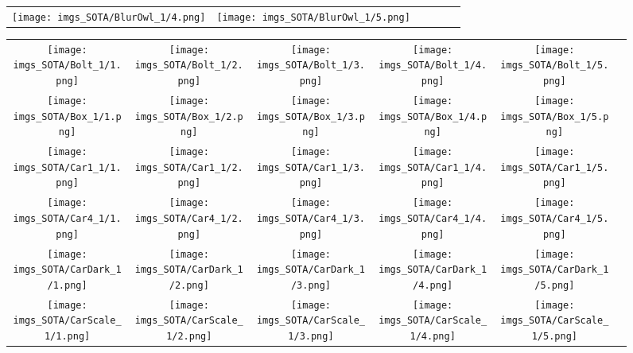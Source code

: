 \begin{figure}[H]
\begin{tabular}{@{}c@{}c@{}c@{}c@{}c@{}c@{}}
\texttt{[image: imgs\_SOTA/BlurOwl\_1/4.png]}&
\texttt{[image: imgs\_SOTA/BlurOwl\_1/5.png]}&
\\
\end{tabular}\end{figure}\begin{figure}[H]
\setlength{\tabcolsep}{6pt}
\renewcommand{\arraystretch}{0}
\begin{tabular}{@{}c@{}c@{}c@{}c@{}c@{}c@{}}\texttt{[image: imgs\_SOTA/Bolt\_1/1.png]}&
\texttt{[image: imgs\_SOTA/Bolt\_1/2.png]}&
\texttt{[image: imgs\_SOTA/Bolt\_1/3.png]}&
\texttt{[image: imgs\_SOTA/Bolt\_1/4.png]}&
\texttt{[image: imgs\_SOTA/Bolt\_1/5.png]}&
\\
\texttt{[image: imgs\_SOTA/Box\_1/1.png]}&
\texttt{[image: imgs\_SOTA/Box\_1/2.png]}&
\texttt{[image: imgs\_SOTA/Box\_1/3.png]}&
\texttt{[image: imgs\_SOTA/Box\_1/4.png]}&
\texttt{[image: imgs\_SOTA/Box\_1/5.png]}&
\\
\texttt{[image: imgs\_SOTA/Car1\_1/1.png]}&
\texttt{[image: imgs\_SOTA/Car1\_1/2.png]}&
\texttt{[image: imgs\_SOTA/Car1\_1/3.png]}&
\texttt{[image: imgs\_SOTA/Car1\_1/4.png]}&
\texttt{[image: imgs\_SOTA/Car1\_1/5.png]}&
\\
\texttt{[image: imgs\_SOTA/Car4\_1/1.png]}&
\texttt{[image: imgs\_SOTA/Car4\_1/2.png]}&
\texttt{[image: imgs\_SOTA/Car4\_1/3.png]}&
\texttt{[image: imgs\_SOTA/Car4\_1/4.png]}&
\texttt{[image: imgs\_SOTA/Car4\_1/5.png]}&
\\
\texttt{[image: imgs\_SOTA/CarDark\_1/1.png]}&
\texttt{[image: imgs\_SOTA/CarDark\_1/2.png]}&
\texttt{[image: imgs\_SOTA/CarDark\_1/3.png]}&
\texttt{[image: imgs\_SOTA/CarDark\_1/4.png]}&
\texttt{[image: imgs\_SOTA/CarDark\_1/5.png]}&
\\
\texttt{[image: imgs\_SOTA/CarScale\_1/1.png]}&
\texttt{[image: imgs\_SOTA/CarScale\_1/2.png]}&
\texttt{[image: imgs\_SOTA/CarScale\_1/3.png]}&
\texttt{[image: imgs\_SOTA/CarScale\_1/4.png]}&
\texttt{[image: imgs\_SOTA/CarScale\_1/5.png]}&

\end{tabular}
\end{figure}
